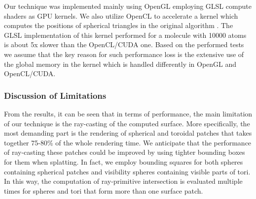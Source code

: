 
Our technique was implemented mainly using OpenGL employing GLSL compute shaders as GPU kernels.
We also utilize OpenCL to accelerate a kernel which computes the positions of spherical triangles in the original algorithm \cite{krone2011parallel}.
The GLSL implementation of this kernel performed for a molecule with {\tweakedsim}10000 atoms is about 5x slower than the OpenCL/CUDA one.
Based on the performed tests we assume that the key reason for such performance loss is the extensive use of the global memory in the kernel which is handled differently in OpenGL and OpenCL/CUDA.

\subsubsection{Discussion of Limitations}
From the results, it can be seen that in terms of performance, the main limitation of our technique is the ray-casting of the computed surface.
More specifically, the most demanding part is the rendering of spherical and toroidal patches that takes together 75-80\% of the whole rendering time.
We anticipate that the performance of ray-casting these patches could be improved by using tighter bounding boxes for them when splatting.
In fact, we employ bounding squares for both spheres containing spherical patches and visibility spheres containing visible parts of tori.
In this way, the computation of ray-primitive intersection is evaluated multiple times for spheres and tori that form more than one surface patch.


